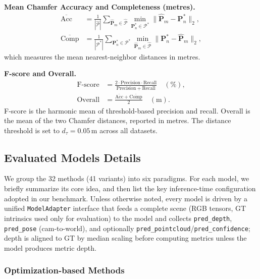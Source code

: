 \noindent\textbf{Mean Chamfer Accuracy and Completeness (metres).}
\begin{align}
  \overline{\mathrm{Acc}}
  &= \frac{1}{|\hat{\mathcal{P}}|}\sum_{\hat{\mathbf{P}}_m\in\hat{\mathcal{P}}}
    \min_{\mathbf{P}_n^{*}\in\mathcal{P}^{*}}\bigl\|\hat{\mathbf{P}}_m - 
    \mathbf{P}_n^{*}\bigr\|_2, \\
  \overline{\mathrm{Comp}}
  &= \frac{1}{|\mathcal{P}^{*}|}\sum_{\mathbf{P}_n^{*}\in\mathcal{P}^{*}}
    \min_{\hat{\mathbf{P}}_m\in\hat{\mathcal{P}}}\bigl\|\mathbf{P}_n^{*} - 
    \hat{\mathbf{P}}_m\bigr\|_2,
\end{align}
which measures the mean nearest-neighbor distances in metres.

\noindent\textbf{F-score and Overall.}
\begin{align}
  \text{F-score} &= \frac{2\cdot\mathrm{Precision}\cdot\mathrm{Recall}}
    {\mathrm{Precision}+\mathrm{Recall}}\quad(\%), \\
  \text{Overall}  &= \frac{\overline{\mathrm{Acc}}+\overline{\mathrm{Comp}}}{2}
    \quad(\mathrm{m}).
\end{align}
F-score is the harmonic mean of threshold-based precision and recall. 
Overall is the mean of the two Chamfer distances, reported in metres. 
The distance threshold is set to $d_{\tau}=0.05$\,m across all datasets.

\subsection{Evaluated Models Details}
\label{sec:model_overview}

We group the 32 methods (41 variants) into six paradigms.
%
For each model, we briefly summarize its core idea, and then list the key inference-time configuration adopted in our benchmark.
%
Unless otherwise noted, every model is driven by a unified \texttt{ModelAdapter} interface that feeds a complete scene (RGB tensors, GT intrinsics used only for evaluation) to the model and collects \texttt{pred\_depth}, \texttt{pred\_pose} (cam-to-world), and optionally \texttt{pred\_pointcloud}/\texttt{pred\_confidence}; depth is aligned to GT by median scaling before computing metrics unless the model produces metric depth.

\subsubsection{Optimization-based Methods}


